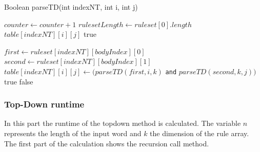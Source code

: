 \documentclass[a4paper, 11pt]{article}
\begin{document}
\begin{algorithm}[H]
\caption{Boolean parseTD(int indexNT, int i, int j)}\label{alg:cap}
\begin{algorithmic}[1]
\State $counter \gets counter+1$
\State $rulesetLength \gets ruleset[0].length$
\State \Return $table[indexNT][i][j]$
\EndIf
{}
\State \Return true
\EndIf
\EndFor

\Else
{}
\State $first \gets ruleset[indexNT][bodyIndex][0]$
\State $second \gets ruleset[indexNT][bodyIndex][1]$
\State $table[indexNT][i][j] \gets (parseTD(first,i,k)$ \texttt{and} $parseTD(second,k,j))$
\State \Return true
\EndIf
\EndFor
\EndIf
\EndFor
\EndIf
\State \Return false
\end{algorithmic}
\end{algorithm}

\subsubsection{Top-Down runtime}
\label{topdownruntime}

In this part the runtime of the topdown method is calculated.
The variable $n$ represents the length of the input word and $k$ the dimension of the rule array. The first part of the calculation shows the recursion call method.
\end{document}
